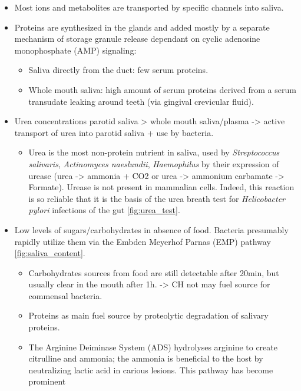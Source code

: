 \begin{tcolorbox}[
    title=Saliva,
    title filled=false,
    colback=blue!5!white,
    colframe=blue!75!black]
    \begin{itemize}
        \item Most ions and metabolites are transported by specific channels into saliva. 
        \item Proteins are synthesized in the glands and added mostly by a separate mechanism of storage granule release
        dependant on cyclic adenosine monophosphate (AMP) signaling:
        \begin{itemize}
            \item Saliva directly from the duct: few serum proteins.
            \item Whole mouth saliva: high amount of serum proteins derived from a serum transudate leaking around teeth 
            (via gingival crevicular fluid).
        \end{itemize}
        \item Urea concentrations  parotid saliva > whole mouth saliva/plasma -> active transport of urea into parotid 
        saliva + use by bacteria.
        \begin{itemize}
            \item Urea is the most non-protein nutrient in saliva, used by \textit{Streptococcus salivaris}, 
            \textit{Actinomyces naeslundii}, \textit{Haemophilus} by their expression of urease 
            (urea -> ammonia + CO2 or urea -> ammonium carbamate -> Formate). Urease is not present in mammalian cells. 
            Indeed, this reaction is so reliable that it is the basis of the urea breath test for \textit{Helicobacter pylori} 
            infections of the gut \autoref{fig:urea_test}. 
        \end{itemize}
        \item Low levels of sugars/carbohydrates in absence of food. Bacteria presumably rapidly utilize them via the 
        Embden Meyerhof Parnas (EMP) pathway \autoref{fig:saliva_content}.
        \begin{itemize}
            \item Carbohydrates sources from food are still detectable after 20min, but usually clear in the mouth after 
            1h. -> CH not may fuel source for commensal bacteria. 
            \item Proteins as main fuel source by proteolytic degradation of salivary proteins. 
            \item The Arginine Deiminase System (ADS) hydrolyses arginine to create citrulline and ammonia; the ammonia 
            is beneficial to the host by neutralizing lactic acid in carious lesions. This pathway has become prominent 

\end{itemize}
\end{itemize}
\end{tcolorbox}
